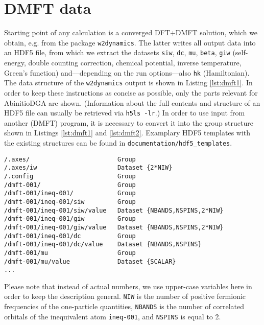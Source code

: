 \documentclass[a4paper,11pt]{article}
\numberwithin{equation}{section} %
\begin{document}
\section{DMFT data}
Starting point of any calculation is a converged DFT+DMFT solution, which we obtain, e.g. from the package
\verb|w2dynamics|. The latter writes all output data into an HDF5 file, from which we extract the datasets \verb|siw|, \verb|dc|, \verb|mu|,
\verb|beta|, \verb|giw| (self-energy, double counting correction, chemical potential, inverse temperature, Green's function)
and---depending on the run options---also \verb|hk| (Hamiltonian).
The data structure of the \verb|w2dynamics| output is shown in Listing \ref{lst:dmft1}.
In order to keep these instructions as concise as possible, only the parts relevant for AbinitioDGA are shown.
(Information about the full contents and structure of an HDF5 file can usually be retrieved via  \verb|h5ls -lr|.) In order to use
input from another (DMFT) program, it is necessary to convert it into the group structure
shown in Listings \ref{lst:dmft1} and \ref{lst:dmft2}.
Examplary HDF5 templates with the existing structures can be found in {\color{blue}\verb+documentation/hdf5_templates+}.
\newpage
\begin{lstlisting}[caption=HDF5-structure of the DMFT output, frame=single, basicstyle=\small, label={lst:dmft1}]
/.axes/                        Group
/.axes/iw                      Dataset {2*NIW}
/.config                       Group
/dmft-001/                     Group
/dmft-001/ineq-001/            Group
/dmft-001/ineq-001/siw         Group
/dmft-001/ineq-001/siw/value   Dataset {NBANDS,NSPINS,2*NIW}
/dmft-001/ineq-001/giw         Group
/dmft-001/ineq-001/giw/value   Dataset {NBANDS,NSPINS,2*NIW}
/dmft-001/ineq-001/dc          Group
/dmft-001/ineq-001/dc/value    Dataset {NBANDS,NSPINS}
/dmft-001/mu                   Group
/dmft-001/mu/value             Dataset {SCALAR}
...
\end{lstlisting}
Please note that instead of actual numbers, we use upper-case variables here in order to keep
the description general. \verb|NIW| is the number of positive fermionic frequencies of the one-particle quantities,
\verb|NBANDS| is the number of correlated orbitals of the inequivalent atom \verb|ineq-001|, and \verb|NSPINS| is equal to 2.
\end{document}
